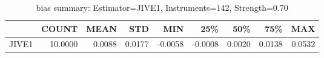 \begin{table}[ht]
\centering
\caption{bias summary: Estimator=JIVE1, Instruments=142, Strength=0.70}
\begin{tabular}{lrrrrrrrr}
\toprule
 & COUNT & MEAN & STD & MIN & 25\% & 50\% & 75\% & MAX \\
\midrule
JIVE1 & 10.0000 & 0.0088 & 0.0177 & -0.0058 & -0.0008 & 0.0020 & 0.0138 & 0.0532 \\
\bottomrule
\end{tabular}
\end{table}
